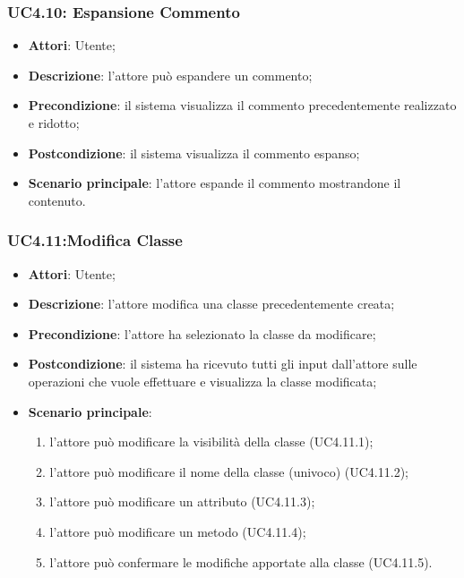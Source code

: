 \subsubsection{UC4.10: Espansione Commento	}
\label{UC4.10}
\begin{itemize}
\item \textbf{Attori}: Utente;
\item \textbf{Descrizione}: l'attore può espandere un commento;	
\item \textbf{Precondizione}: il sistema visualizza il commento precedentemente realizzato e ridotto;	
\item \textbf{Postcondizione}: il sistema visualizza il commento espanso;	
\item \textbf{Scenario principale}:
l'attore espande il commento mostrandone il contenuto.	
\end{itemize}

\subsubsection{UC4.11:Modifica Classe}
\label{UC4.11}
\begin{itemize}
\item \textbf{Attori}: Utente;
\item \textbf{Descrizione}: l'attore modifica una classe precedentemente creata; 
\item \textbf{Precondizione}: l'attore ha selezionato la classe da modificare;	
\item \textbf{Postcondizione}: il sistema ha ricevuto tutti gli input dall'attore sulle operazioni che vuole effettuare e visualizza la classe modificata;
\item \textbf{Scenario principale}:
\begin{enumerate}
	\item l'attore può modificare la visibilità della classe (UC4.11.1);
	\item l'attore può modificare il nome della classe (univoco) (UC4.11.2);
	\item l'attore può modificare un attributo (UC4.11.3);
	\item l'attore può modificare un metodo (UC4.11.4);
	\item l'attore può confermare le modifiche apportate alla classe (UC4.11.5).
\end{enumerate}
\end{itemize}

